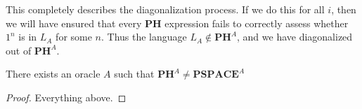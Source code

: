 This completely describes the diagonalization process. If we do this for all $i$, then we will have ensured that every $\bm{PH}$ expression fails to correctly assess whether $1^n$ is in $L_A$ for some $n$. Thus the language $L_A \notin \bm{PH}^A$, and we have diagonalized out of $\bm{PH}^A$. 
\begin{theorem}
	There exists an oracle $A$ such that $\bm{PH}^A \neq \bm{PSPACE}^A$
\end{theorem}
\begin{proof}
	Everything above.
\end{proof}
